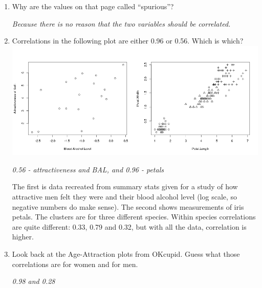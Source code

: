 \begin{enumerate}
\item Why are the values on that page called ``spurious''?
\begin{students}
 \vspace{1cm}      
\end{students}

\begin{key}
  {\it Because there is no reason that the two variables should be
    correlated. }
\end{key}

\item Correlations in the following plot are either 0.96 or 0.56.
  Which is which?\\
\includegraphics[width=\linewidth]{../plots/realCorr.png}
\begin{students}
 \vspace{1cm}      
\end{students}

\begin{key}
  {\it 0.56 - attractiveness and BAL, and 0.96 - petals}
\end{key}

  The first is data recreated from summary stats given for a study of
  how attractive men felt they were and their blood alcohol level (log
  scale, so negative numbers do make sense).
  The second shows measurements of iris petals. The clusters are for
  three different species. Within
  species correlations are quite different: 0.33, 0.79 and 0.32, but
  with all the data, correlation is higher. 

\item Look back at the Age-Attraction plots from OKcupid.
  Guess what those correlations are for women and for men.
\begin{students}
 \vspace{1cm}
\end{students}

\begin{key}
  {\it 0.98  and 0.28}
\end{key}


\end{enumerate}

